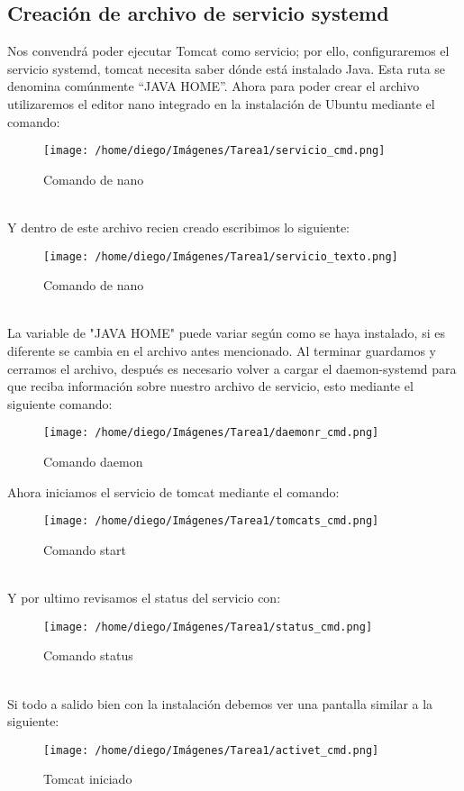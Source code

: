 \documentclass{article}
\begin{document}
		\subsection{Creación de archivo de servicio systemd}
		Nos convendrá poder ejecutar Tomcat como servicio; por ello, configuraremos el servicio systemd, tomcat necesita saber dónde está instalado Java. Esta ruta se denomina comúnmente “JAVA HOME”. Ahora para poder crear el archivo utilizaremos el editor nano integrado en la instalación de Ubuntu mediante el comando:
		\begin{figure}[h]
			\centering
			\texttt{[image: /home/diego/Imágenes/Tarea1/servicio\_cmd.png]}
			\caption{Comando de nano}
		\end{figure}
		\\Y dentro de este archivo recien creado escribimos lo siguiente:
		\begin{figure}[h]
			\centering
			\texttt{[image: /home/diego/Imágenes/Tarea1/servicio\_texto.png]}
			\caption{Comando de nano}
		\end{figure}
		\\La variable de "JAVA HOME" puede variar según como se haya instalado, si es diferente se cambia en el archivo antes mencionado. Al terminar guardamos y cerramos el archivo, después es necesario volver a cargar el daemon-systemd para que reciba información sobre nuestro archivo de servicio, esto mediante el siguiente comando:
		\begin{figure}[h]
			\centering
			\texttt{[image: /home/diego/Imágenes/Tarea1/daemonr\_cmd.png]}
			\caption{Comando daemon}
		\end{figure}
		\newpage
		Ahora iniciamos el servicio de tomcat mediante el comando:
		\begin{figure}[h]
			\centering
			\texttt{[image: /home/diego/Imágenes/Tarea1/tomcats\_cmd.png]}
			\caption{Comando start}
		\end{figure}
		\\Y por ultimo revisamos el status del servicio con:
		\begin{figure}[h]
			\centering
			\texttt{[image: /home/diego/Imágenes/Tarea1/status\_cmd.png]}
			\caption{Comando status}
		\end{figure}
		\\Si todo a salido bien con la instalación debemos ver una pantalla similar a la siguiente:
		\begin{figure}[h]
			\centering
			\texttt{[image: /home/diego/Imágenes/Tarea1/activet\_cmd.png]}
			\caption{Tomcat iniciado}
		\end{figure}
		\newpage
\end{document}
